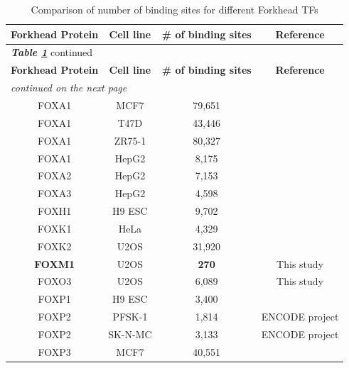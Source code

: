 \begin{longtable}{|c|c|c|c|}
    \caption{Comparison of number of binding sites for different Forkhead TFs\label{table:fkhtfschip}}\\
    \hline
    \textbf{Forkhead Protein} & \textbf{Cell line} & \textbf{\# of binding sites} & \textbf{Reference}\\
    \hline
    \endfirsthead
    \multicolumn{3}{l}{\textbf{\textit{Table \ref{table:fkhtfschip}}} continued}\\
    \hline
    \textbf{Forkhead Protein} & \textbf{Cell line} & \textbf{\# of binding sites} & \textbf{Reference}\\
    \hline
    \endhead
    \hline
    \multicolumn{3}{l}{\textit{continued on the next page}}\\
    \endfoot
    \hline \hline
    \endlastfoot
    
    FOXA1 & MCF7 & 79,651 & \cite{hurtado2011foxa1}\\
    \hline
    FOXA1 & T47D & 43,446 & \cite{hurtado2011foxa1}\\
    \hline
    FOXA1 & ZR75-1 & 80,327 & \cite{hurtado2011foxa1}\\
    \hline
    FOXA1 & HepG2 & 8,175 & \cite{motallebipour2009differential}\\
    \hline
    FOXA2 & HepG2 & 7,153 & \cite{motallebipour2009differential}\\
    \hline
    FOXA3 & HepG2 & 4,598 & \cite{motallebipour2009differential}\\
    \hline
    FOXH1 & H9 ESC & 9,702 & \cite{kim2011chromatin}\\
    \hline
    FOXK1 & HeLa & 4,329 & \cite{grant2012live-cell}\\
    \hline
    FOXK2 & U2OS & 31,920 & \cite{ji2012the}\\
    \hline
    \color{red} \textbf{FOXM1} & U2OS & \color{red} \textbf{270} & This study\\
    \hline
    FOXO3 & U2OS & 6,089 & This study\\
    \hline
    FOXP1 & H9 ESC & 3,400 & \cite{gabut2011an}\\
    \hline
    FOXP2 & PFSK-1 & 1,814 & ENCODE project\\
    \hline
    FOXP2 & SK-N-MC & 3,133 & ENCODE project\\
    \hline
    FOXP3 & MCF7 & 40,551 & \cite{katoh2011foxp3}\\
    \hline
\end{longtable}

